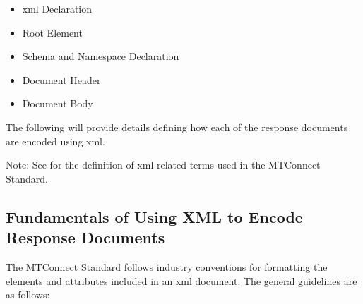 \begin{itemize}
\item \gls{xml} Declaration

\item Root Element

\item Schema and Namespace Declaration

\item Document Header

\item Document Body
\end{itemize}

The following will provide details defining how each of the \glspl{response document} are encoded using \gls{xml}.

\begin{note}
Note: See  for the definition of \gls{xml} related terms used in the MTConnect Standard.

\end{note}

\subsection{Fundamentals of Using XML to Encode Response Documents}

The MTConnect Standard follows industry conventions for formatting the elements and attributes included in an \gls{xml} document.  The general guidelines are as follows: 

